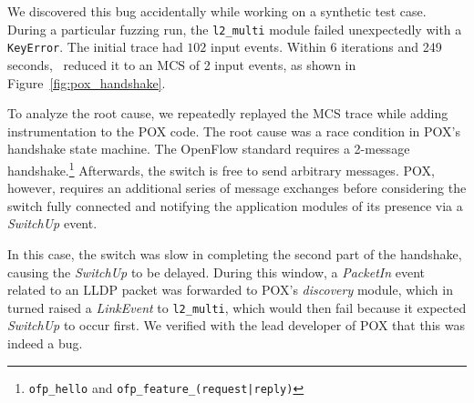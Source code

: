  We discovered this bug accidentally
while working on a synthetic test case. During a particular fuzzing run, the
\verb=l2_multi= module failed unexpectedly with a \verb=KeyError=. The initial trace
had $102$ input events. Within 6 iterations and 249 seconds,
\projectname~reduced it to an MCS of 2 input events, as shown in
Figure~\ref{fig:pox_handshake}.

To analyze the root cause, we repeatedly replayed the MCS trace while adding
instrumentation to the POX code. The root cause was a race
condition in POX's handshake state machine. The OpenFlow standard
requires a 2-message handshake.\footnote{\texttt{ofp\_hello} and
\texttt{ofp\_feature\_(request|reply)}} Afterwards, the switch is free to send
arbitrary messages. POX, however, requires an additional series of message
exchanges before considering the switch fully connected and notifying the
application modules of its presence via a \emph{SwitchUp} event.

In this case, the switch was slow in completing the second part
of the handshake, causing the \emph{SwitchUp} to be delayed. During this window,
a \emph{PacketIn} event related to an LLDP packet was forwarded to POX's
\emph{discovery} module, which in turned raised a \emph{LinkEvent} to
\verb=l2_multi=, which would then fail because it expected \emph{SwitchUp} to occur first.
We verified with the lead developer of POX that this was indeed a bug.

